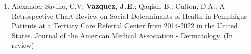 \begin{cventries}
{\begin{enumerate}
    \item Alexander-Savino, C.V; {\bf Vazquez, J.E.}; Qaqish, B.; Culton, D.A.; A Retrospective Chart Review on Social Determinants of Health in Pemphigus Patients at a Tertiary Care Referral Center from 2014-2022 in the United States. Journal of the American Medical Association - Dermatology. (In review)

    
\end{enumerate}
}

\end{cventries}

